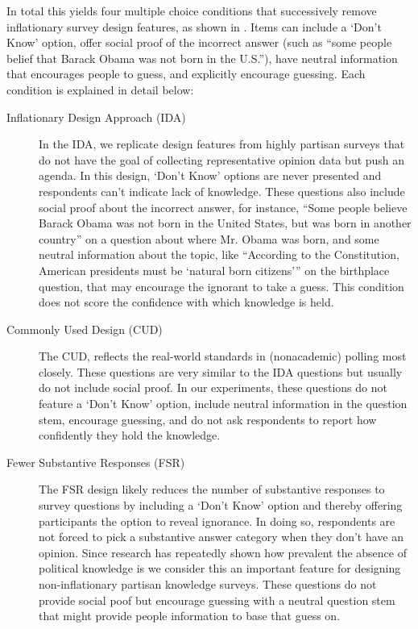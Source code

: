 \documentclass[12pt, letterpaper]{article}
\begin{document}
	In total this yields four multiple choice conditions that successively remove inflationary survey design features, as shown in . Items can include a `Don't Know' option, offer social proof of the incorrect answer (such as ``some people belief that Barack Obama was not born in the U.S.''), have neutral information that encourages people to guess, and explicitly encourage guessing. Each condition is explained in detail below:
	
	
	
	\begin{description}
		\item[Inflationary Design Approach (IDA)] \label{txt:IDA} In the IDA, we replicate design features from highly partisan surveys that do not have the goal of collecting representative opinion data but push an agenda. In this design, `Don't Know' options are never presented and respondents can't indicate lack of knowledge. These questions also include social proof  about the incorrect answer, for instance, ``Some people believe Barack Obama was not born in the United States, but was born in another country'' on a question about where Mr. Obama was born, and some neutral information about the topic, like ``According to the Constitution, American presidents must be `natural born citizens''' on the birthplace question, that may encourage the ignorant to take a guess.  This condition does not score the confidence with which knowledge is held.
		\item[Commonly Used Design (CUD)] \label{txt:CUD} The CUD, reflects the real-world standards in (nonacademic) polling most closely. These questions are very similar to the IDA questions but usually do not include social proof. In our experiments, these questions do not feature a `Don't Know' option, include neutral information in the question stem, encourage guessing, and do not ask respondents to report how confidently they hold the knowledge.
		\item[Fewer Substantive Responses (FSR)] \label{txt:FSR} The FSR design likely reduces the number of substantive responses to survey questions by including a `Don't Know' option and thereby offering participants the option to reveal ignorance. In doing so, respondents are not forced to pick a substantive answer category when they don't have an opinion. Since research has repeatedly shown how prevalent the absence of political knowledge is we consider this an important feature for designing non-inflationary partisan knowledge surveys. These questions do not provide social poof but encourage guessing with a neutral question stem that might provide people information to base that guess on.

\end{description}
\end{document}
